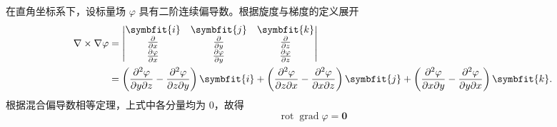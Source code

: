 \begin{myproof}

    在直角坐标系下，设标量场 $\varphi$ 具有二阶连续偏导数。根据旋度与梯度的定义展开
    \begin{equation}\label{eq:rot-grad-proof}
        \begin{aligned}
            \nabla \times \nabla \varphi & = \begin{vmatrix} \symbfit{i} & \symbfit{j} & \symbfit{k} \\ \frac{\partial}{\partial x} & \frac{\partial}{\partial y} & \frac{\partial}{\partial z} \\ \frac{\partial \varphi}{\partial x} & \frac{\partial \varphi}{\partial y} & \frac{\partial \varphi}{\partial z} \end{vmatrix}                                                                                                               \\
                                         & = \left( \frac{\partial^2 \varphi}{\partial y \partial z} - \frac{\partial^2 \varphi}{\partial z \partial y} \right) \symbfit{i} + \left( \frac{\partial^2 \varphi}{\partial z \partial x} - \frac{\partial^2 \varphi}{\partial x \partial z} \right) \symbfit{j} + \left( \frac{\partial^2 \varphi}{\partial x \partial y} - \frac{\partial^2 \varphi}{\partial y \partial x} \right) \symbfit{k}.
        \end{aligned}
    \end{equation}
    根据混合偏导数相等定理，上式中各分量均为 $0$，故得
    \begin{equation}\label{eq:rot-grad-final}
        \boxed{\operatorname{rot} \operatorname{grad} \varphi = \symbf{0}}
    \end{equation}



\end{myproof}
